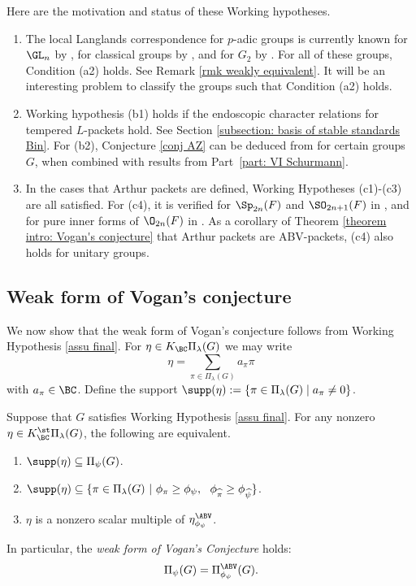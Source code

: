 \documentclass[11pt,letterpaper]{amsart}
\numberwithin{equation}{section}
\begin{document}
\begin{remark} Here are the motivation and status of these Working hypotheses.
 \begin{enumerate}
     \item [(a)] The local Langlands correspondence for $p$-adic groups is currently known for $\GL_n$ by \cites{Hen00, HT01, Sch13}, for classical groups by \cites{Art13, Mok15, KMSW14, MR18, Ish24}, and for $G_2$ by \cites{AX22,GS23}. For all of these groups, Condition (a2) holds. See Remark \ref{rmk weakly equivalent}. It will be an interesting problem to classify the groups such that Condition (a2) holds.
     \item [(b)] Working hypothesis (b1) holds if the endoscopic character relations for tempered $L$-packets hold. See Section \ref{subsection: basis of stable standards Bin}. 
     For (b2), Conjecture \ref{conj AZ} can be deduced from \cite{AO26} for certain groups $G$, when combined with results from Part~\ref{part: VI Schurmann}. 
     \item [(c)] In the cases that Arthur packets are defined, Working Hypotheses (c1)-(c3) are all satisfied. For (c4), it is verified for $\Sp_{2n}(F)$ and $\SO_{2n+1}(F)$ in \cite{HLLZ25}, and for pure inner forms of $\O_{2n}(F)$ in \cite{HLL26}. As a corollary of Theorem \ref{theorem intro: Vogan's conjecture} that Arthur packets are ABV-packets, (c4) also holds for unitary groups.
 \end{enumerate}
\end{remark}

\subsection{Weak form of Vogan's conjecture}

We now show that the weak form of Vogan's conjecture follows from Working Hypothesis \ref{assu final}. For $\eta \in K_{\BC}\Pi_{\lambda}(G)$ we may write
\[
\eta = \sum_{\pi \in \Pi_{\lambda}(G)} a_{\pi} \pi
\]
with $a_{\pi} \in \BC$. Define the support $\supp(\eta) := \{\pi \in \Pi_{\lambda}(G) \mid a_{\pi} \neq 0\}$.


\begin{theorem}\label{thm Vogan}
    Suppose that $G$ satisfies Working Hypothesis \ref{assu final}. For any nonzero $\eta \in K_{\BC}^\st\Pi_{\lambda}(G)$,
    the following are equivalent.
    \begin{enumerate}
    \item [(i)] 
    $\supp(\eta) \subseteq \Pi_{\psi}(G)$.
    \item [(ii)] $\supp(\eta) \subseteq \{\pi\in \Pi_{\lambda}(G) \ | \ \phi_{\pi}\geq \phi_{\psi},\ \ \phi_{\widehat{\pi}} \geq \phi_{\widehat{\psi}} \}$.
    \item [(iii)] $\eta$ is a nonzero scalar multiple of $\eta_{\phi_{\psi}}^{\ABV}$.
    \end{enumerate}
    In particular, the {\it weak form of Vogan's Conjecture} holds:
    \[
    \Pi_{\psi}(G)
    =
    \Pi_{\phi_{\psi}}^{\ABV}(G).
    \]
\end{theorem}
\end{document}
